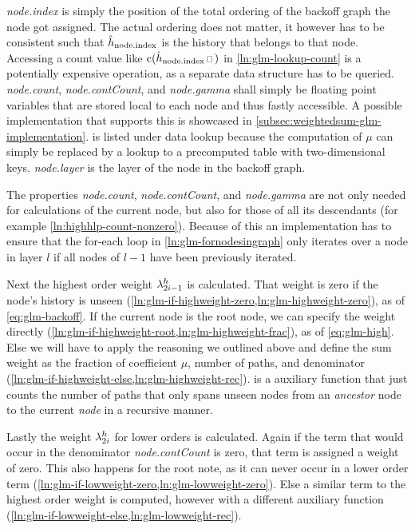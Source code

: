 \emph{node.index} is simply the position of the total ordering of the backoff
graph the node got assigned.
The actual ordering does not matter, it however has to be consistent such that
$\DerivedHistory[\text{node.index}]$ is the history that belongs to that node.
Accessing a count value like $\Count(\DerivedHistory[\text{node.index}] \Skp)$
in \cref{ln:glm-lookup-count} is a potentially expensive operation, as a
separate data structure has to be queried.
\emph{node.count}, \emph{node.contCount}, and \emph{node.gamma} shall simply be
floating point variables that are stored local to each node and thus fastly
accessible.
A possible implementation that supports this is showcased in
\cref{subsec:weightedsum-glm-implementation}.
 is listed under data lookup because the computation
of $\mu$ can simply be replaced by a lookup to a precomputed table with
two-dimensional keys. \emph{node.layer} is the layer of the node in the
backoff graph.

The properties \emph{node.count}, \emph{node.contCount}, and
\emph{node.gamma} are not only needed for calculations of the current node, but
also for those of all its descendants (for example
\cref{ln:highhlp-count-nonzero}).
Because of this an implementation has to ensure that the for-each loop in
\cref{ln:glm-fornodesingraph} only iterates over a node in layer $l$ if all
nodes of $l-1$ have been previously iterated.

Next the highest order weight $\lambda^h_{2 i - 1}$ is calculated.
That weight is zero if the node's history is unseen
(\cref{ln:glm-if-highweight-zero,ln:glm-highweight-zero}), as of
\cref{eq:glm-backoff}.
If the current node is the root node, we can specify the weight directly
(\cref{ln:glm-if-highweight-root,ln:glm-highweight-frac}), as of
\cref{eq:glm-high}.
Else we will have to apply the reasoning we outlined above and define the sum
weight as the fraction of coefficient $\mu$, number of paths, and denominator
(\cref{ln:glm-if-highweight-else,ln:glm-highweight-rec}).
 is a auxiliary function
that just counts the number of paths that only spans unseen nodes from
an \emph{ancestor} node to the current \emph{node} in a recursive manner.

Lastly the weight $\lambda^h_{2 i}$ for lower orders is calculated.
Again if the term that would occur in the denominator \emph{node.contCount} is
zero, that term is assigned a weight of zero.
This also happens for the root note, as it can never occur in a lower order term
(\cref{ln:glm-if-lowweight-zero,ln:glm-lowweight-zero}).
Else a similar term to the highest order weight is computed, however with a
different auxiliary function
(\cref{ln:glm-if-lowweight-else,ln:glm-lowweight-rec}).

